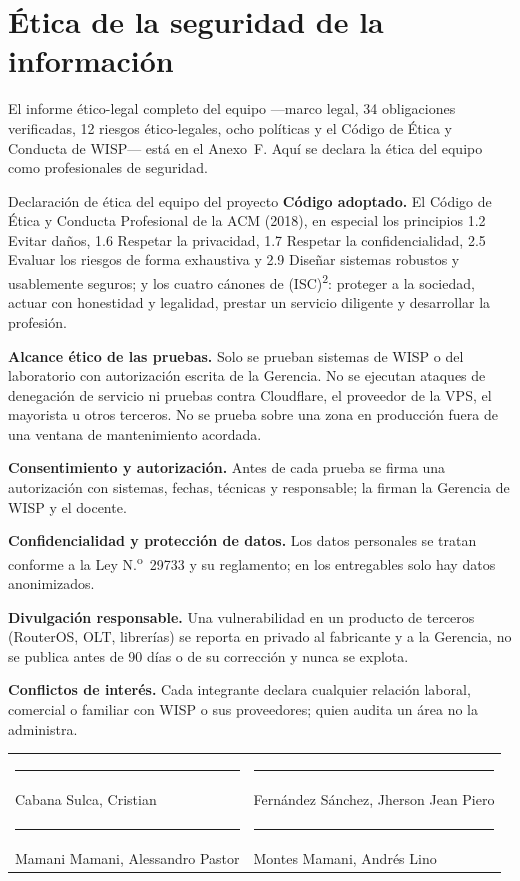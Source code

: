 \section{Ética de la seguridad de la información}
\label{sec:ce03-sgsi-etica}

El informe ético-legal completo del equipo ---marco legal, 34 obligaciones verificadas, 12
riesgos ético-legales, ocho políticas y el Código de Ética y Conducta de WISP--- está en el
Anexo~F. Aquí se declara la ética del equipo como profesionales de seguridad.

\begin{upeubox}{Declaración de ética del equipo del proyecto}
\textbf{Código adoptado.} El Código de Ética y Conducta Profesional de la ACM (2018), en
especial los principios 1.2 Evitar daños, 1.6 Respetar la privacidad, 1.7 Respetar la
confidencialidad, 2.5 Evaluar los riesgos de forma exhaustiva y 2.9 Diseñar sistemas
robustos y usablemente seguros; y los cuatro cánones de (ISC)\textsuperscript{2}: proteger a
la sociedad, actuar con honestidad y legalidad, prestar un servicio diligente y desarrollar
la profesión.

\textbf{Alcance ético de las pruebas.} Solo se prueban sistemas de WISP o del laboratorio
con autorización escrita de la Gerencia. No se ejecutan ataques de denegación de servicio ni
pruebas contra Cloudflare, el proveedor de la VPS, el mayorista u otros terceros. No se
prueba sobre una zona en producción fuera de una ventana de mantenimiento acordada.

\textbf{Consentimiento y autorización.} Antes de cada prueba se firma una autorización con
sistemas, fechas, técnicas y responsable; la firman la Gerencia de WISP y el docente.

\textbf{Confidencialidad y protección de datos.} Los datos personales se tratan conforme a
la Ley N.\textsuperscript{o}~29733 y su reglamento; en los entregables solo hay datos
anonimizados.

\textbf{Divulgación responsable.} Una vulnerabilidad en un producto de terceros (RouterOS,
OLT, librerías) se reporta en privado al fabricante y a la Gerencia, no se publica antes de
90 días o de su corrección y nunca se explota.

\textbf{Conflictos de interés.} Cada integrante declara cualquier relación laboral,
comercial o familiar con WISP o sus proveedores; quien audita un área no la administra.

\medskip
\begin{tabularx}{\linewidth}{XX}
\rule{5.5cm}{0.4pt} & \rule{5.5cm}{0.4pt} \\
Cabana Sulca, Cristian & Fernández Sánchez, Jherson Jean Piero \\[10pt]
\rule{5.5cm}{0.4pt} & \rule{5.5cm}{0.4pt} \\
Mamani Mamani, Alessandro Pastor & Montes Mamani, Andrés Lino \\
\end{tabularx}
\end{upeubox}

